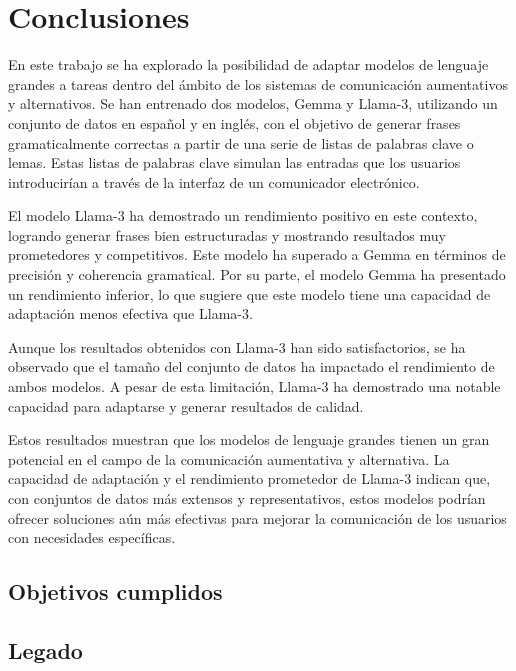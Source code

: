 \documentclass[11pt,spanish,listoffigures,listoftables]{tfgetsinf}
\begin{document}

\chapter{Conclusiones} \label{cap5}

En este trabajo se ha explorado la posibilidad de adaptar modelos de lenguaje grandes a tareas dentro del ámbito de los sistemas de comunicación aumentativos y alternativos. Se han entrenado dos modelos, Gemma y Llama-3, utilizando un conjunto de datos en español y en inglés, con el objetivo de generar frases gramaticalmente correctas a partir de una serie de listas de palabras clave o lemas. Estas listas de palabras clave simulan las entradas que los usuarios introducirían a través de la interfaz de un comunicador electrónico.

El modelo Llama-3 ha demostrado un rendimiento positivo en este contexto, logrando generar frases bien estructuradas y mostrando resultados muy prometedores y competitivos. Este modelo ha superado a Gemma en términos de precisión y coherencia gramatical. Por su parte, el modelo Gemma ha presentado un rendimiento inferior, lo que sugiere que este modelo tiene una capacidad de adaptación menos efectiva que Llama-3.

Aunque los resultados obtenidos con Llama-3 han sido satisfactorios, se ha observado que el tamaño del conjunto de datos ha impactado el rendimiento de ambos modelos. A pesar de esta limitación, Llama-3 ha demostrado una notable capacidad para adaptarse y generar resultados de calidad.

Estos resultados muestran que los modelos de lenguaje grandes tienen un gran potencial en el campo de la comunicación aumentativa y alternativa. La capacidad de adaptación y el rendimiento prometedor de Llama-3 indican que, con conjuntos de datos más extensos y representativos, estos modelos podrían ofrecer soluciones aún más efectivas para mejorar la comunicación de los usuarios con necesidades específicas.

\section{Objetivos cumplidos}

\section{Legado}
\end{document}
